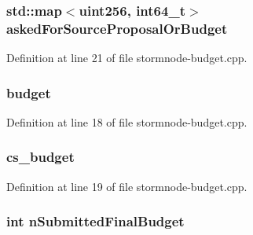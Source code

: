 \subsubsection[{asked\+For\+Source\+Proposal\+Or\+Budget}]{\setlength{\rightskip}{0pt plus 5cm}std\+::map$<${\bf uint256}, {\bf int64\+\_\+t}$>$ asked\+For\+Source\+Proposal\+Or\+Budget}\label{stormnode-budget_8cpp_adc8d4231410936249a05d634e33b44d3}


Definition at line 21 of file stormnode-\/budget.\+cpp.

\hypertarget{stormnode-budget_8cpp_ad9842d355854ad5602728a96cf684706}{}
\subsubsection[{budget}]{ budget}\label{stormnode-budget_8cpp_ad9842d355854ad5602728a96cf684706}


Definition at line 18 of file stormnode-\/budget.\+cpp.

\hypertarget{stormnode-budget_8cpp_a2343791d00e01ac44a133ed313432d92}{}
\subsubsection[{cs\+\_\+budget}]{ cs\+\_\+budget}\label{stormnode-budget_8cpp_a2343791d00e01ac44a133ed313432d92}


Definition at line 19 of file stormnode-\/budget.\+cpp.

\hypertarget{stormnode-budget_8cpp_ae7a238980012394beb6c3a09d00984b8}{}
\subsubsection[{n\+Submitted\+Final\+Budget}]{\setlength{\rightskip}{0pt plus 5cm}int n\+Submitted\+Final\+Budget}\label{stormnode-budget_8cpp_ae7a238980012394beb6c3a09d00984b8}


